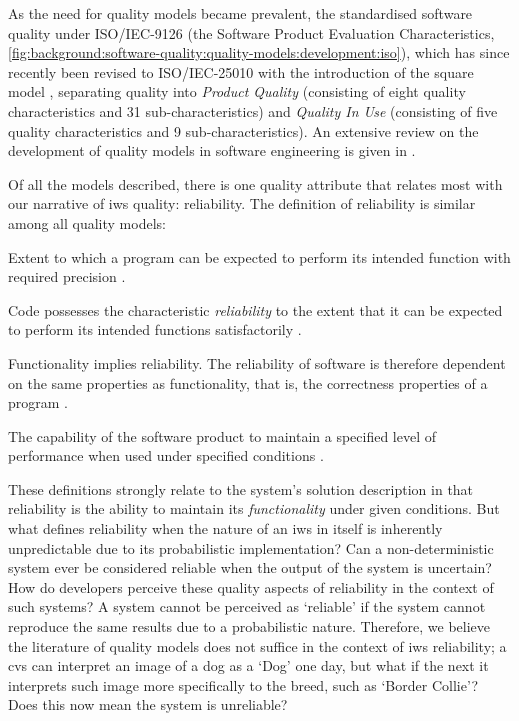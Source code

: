 As the need for quality models became prevalent, the \citeauthor{ISO9126:1999} standardised software quality under ISO/IEC-9126 \citep{ISO9126:1999} (the Software Product Evaluation Characteristics, \cref{fig:background:software-quality:quality-models:development:iso}), which has since recently been revised to ISO/IEC-25010 with the introduction of the \gls{square} model \citep{ISO25010:2011}, separating quality into \textit{Product Quality} (consisting of eight quality characteristics and 31 sub-characteristics) and \textit{Quality In Use} (consisting of five quality characteristics and 9 sub-characteristics).
An extensive review on the development of quality models in software engineering is given in \citep{AlQutaish:2010vua}.

Of all the models described, there is one quality attribute that relates most with our narrative of \gls{iws} quality: reliability. The definition of reliability is similar among all quality models:

\begin{description}[font=\itshape,style=multiline,leftmargin=3cm]
  \item[\citeauthor{McCall:1977uy}] Extent to which a program can be expected to perform its intended function with required precision \citep{McCall:1977uy}.
  \item[\citeauthor{Boehm:1978vv}] Code possesses the characteristic \textit{reliability} to the extent that it can be expected to perform its intended functions satisfactorily \citep{Boehm:1978vv}.
  \item[\citeauthor{Dromey:1995wy}] Functionality implies reliability. The reliability of software is therefore  dependent on the same properties as functionality, that is, the correctness properties of a program \citep{Dromey:1995wy}.
  \item[ISO/IEC-9126] The capability of the software product to maintain a specified level of performance when used under specified conditions \citep{ISO9126:1999}.
\end{description}

These definitions strongly relate to the system's solution description in that reliability is the ability to maintain its \textit{functionality} under given conditions. But what defines reliability when the nature of an \gls{iws} in itself is inherently unpredictable due to its probabilistic implementation? Can a non-deterministic system ever be considered reliable when the output of the system is uncertain? How do developers perceive these quality aspects of reliability in the context of such systems? A system cannot be perceived as `reliable' if the system cannot reproduce the same results due to a probabilistic nature. Therefore, we believe the literature of quality models does not suffice in the context of \gls{iws} reliability; a \gls{cvs} can interpret an image of a dog as a `Dog' one day, but what if the next it interprets such image more specifically to the breed, such as `Border Collie'? Does this now mean the system is unreliable? 

